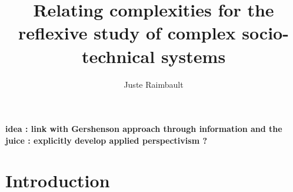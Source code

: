 

\title*{Relating complexities for the reflexive study of complex socio-technical systems}
\author{Juste Raimbault}
%
%
\maketitle





\textbf{idea : link with Gershenson approach through information and the juice : explicitly develop applied perspectivism ?}


\section{Introduction}








